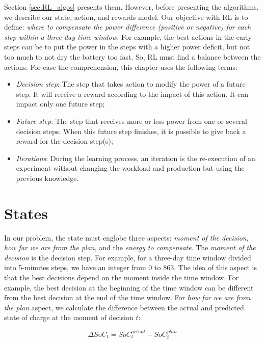 Section \ref{sec:RL_algos} presents them. However, before presenting the algorithms, we describe our state, action, and rewards model. Our objective with RL is to define: \textit{where to compensate the power difference (positive or negative) for each step within a three-day time window.} For example, the best actions in the early steps can be to put the power in the steps with a higher power deficit, but not too much to not dry the battery too fast. So, RL must find a balance between the actions. For ease the comprehension, this chapter uses the following terms:
\begin{itemize}
    \item \textit{Decision step}: The step that takes action to modify the power of a future step. It will receive a reward according to the impact of this action. It can impact only one future step;
    \item \textit{Future step}: The step that receives more or less power from one or several decision steps. When this future step finishes, it is possible to give back a reward for the decision step(s);
    \item \textit{Iterations}: During the learning process, an iteration is the re-execution of an experiment without changing the workload and production but using the previous knowledge.
\end{itemize}

\section{States}

In our problem, the state must englobe three aspects: \textit{moment of the decision}, \textit{how far we are from the plan}, and the \textit{energy to compensate}. The \textit{moment of the decision} is the decision step. For example, for a three-day time window divided into 5-minutes steps, we have an integer from 0 to 863. The idea of this aspect is that the best decisions depend on the moment inside the time window. For example, the best decision at the beginning of the time window can be different from the best decision at the end of the time window. For \textit{how far we are from the plan} aspect, we calculate the difference between the actual and predicted state of charge at the moment of decision $t$:

\begin{equation}
    \label{equ:delta_SOC}
    \Delta SoC_t = SoC^{actual}_{t} - SoC^{plan}_{t}
\end{equation}

